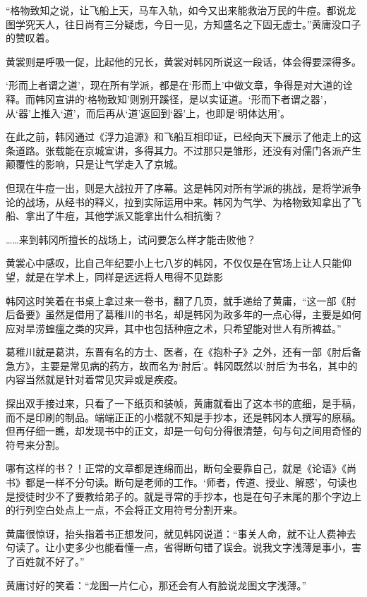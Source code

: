 “格物致知之说，让飞船上天，马车入轨，如今又出来能救治万民的牛痘。都说龙图学究天人，往日尚有三分疑虑，今日一见，方知盛名之下固无虚士。”黄庸没口子的赞叹着。

黄裳则是呼吸一促，比起他的兄长，黄裳对韩冈所说这一段话，体会得要深得多。

‘形而上者谓之道’，现在所有学派，都是在‘形而上’中做文章，争得是对大道的诠释。而韩冈宣讲的‘格物致知’则别开蹊径，是以实证道。‘形而下者谓之器’，从‘器’上推入‘道’，而后再从‘道’返回到‘器’上，也即是‘明体达用’。

在此之前，韩冈通过《浮力追源》和飞船互相印证，已经向天下展示了他走上的这条道路。张载能在京城宣讲，多得其力。不过那只是雏形，还没有对儒门各派产生颠覆性的影响，只是让气学走入了京城。

但现在牛痘一出，则是大战拉开了序幕。这是韩冈对所有学派的挑战，是将学派争论的战场，从经书的释义，拉到实际运用中来。韩冈为气学、为格物致知拿出了飞船、拿出了牛痘，其他学派又能拿出什么相抗衡？

……来到韩冈所擅长的战场上，试问要怎么样才能击败他？

黄裳心中感叹，比自己年纪要小上七八岁的韩冈，不仅仅是在官场上让人只能仰望，就是在学术上，同样是远远将人甩得不见踪影

韩冈这时笑着在书桌上拿过来一卷书，翻了几页，就手递给了黄庸，“这一部《肘后备要》虽然是借用了葛稚川的书名，却是韩冈为政多年的一点心得，主要是如何应对旱涝蝗瘟之类的灾异，其中也包括种痘之术，只希望能对世人有所裨益。”

葛稚川就是葛洪，东晋有名的方士、医者，在《抱朴子》之外，还有一部《肘后备急方》，主要是常见病的药方，故而名为‘肘后’。韩冈既然以‘肘后’为书名，其中的内容当然就是针对着常见灾异或是疾疫。

探出双手接过来，只看了一下纸页和装帧，黄庸就看出了这本书的底细，是手稿，而不是印刷的制品。端端正正的小楷就不知是手抄本，还是韩冈本人撰写的原稿。但再仔细一瞧，却发现书中的正文，却是一句句分得很清楚，句与句之间用奇怪的符号来分割。

哪有这样的书？！正常的文章都是连绵而出，断句全要靠自己，就是《论语》《尚书》都是一样不分句读。断句是老师的工作。‘师者，传道、授业、解惑’，句读也是授徒时少不了要教给弟子的。就是寻常的手抄本，也是在句子末尾的那个字边上的行列空白处点上一点，不会将正文用符号分割开来。

黄庸很惊讶，抬头指着书正想发问，就见韩冈说道：“事关人命，就不让人费神去句读了。让小吏多少也能看懂一点，省得断句错了误会。说我文字浅薄是事小，害了百姓就不好了。”

黄庸讨好的笑着：“龙图一片仁心，那还会有人有脸说龙图文字浅薄。”

